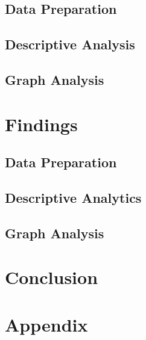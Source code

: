 \documentclass[conference]{IEEEtran}
\begin{document}
\subsection{Data Preparation}
\label{methods-data-preparation}


\subsection{Descriptive Analysis}
\label{methods-descriptive}


\subsection{Graph Analysis}
\label{methods-graph-analysis}


\section{Findings}
\label{findings}
\subsection{Data Preparation}
\label{findings-data-preparation}


\subsection{Descriptive Analytics}
\label{findings-descriptive}


\subsection{Graph Analysis}
\label{findings-graph-analysis}


\section{Conclusion}
\label{conclusion}





\onecolumn
\section{Appendix}
\label{appendix}

\end{document}
